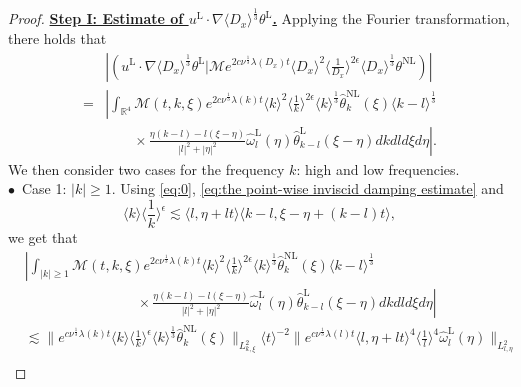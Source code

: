 \documentclass[reqno, 12pt]{amsart} %
\theoremstyle{plain} %
\theoremstyle{definition}
\theoremstyle{remark}
\numberwithin{equation}{section} %
\newcommand{\lt}{\left}
\newcommand{\rt}{\right}
\begin{document}
\begin{proof}
		\underline{\bf Step I: Estimate of  $u^{\mathrm{L}} \cdot  \nabla \langle D_x \rangle^\frac13 \theta^{\mathrm{L}}$.}
		Applying the Fourier transformation, there holds that
		\begin{equation}\begin{aligned} \label{eq:temp8}
				& \left|\left(u^{\mathrm{L}} \cdot \nabla \langle D_x \rangle^\frac13 \theta^{\mathrm{L}} \big| \mathcal{M} e^{2 c \nu^{\frac{1}{3}} \lambda(D_x) t}\langle D_x\rangle^2\langle\frac{1}{D_x}\rangle^{2 \epsilon} \langle D_x \rangle^\frac13 \theta^{\mathrm{NL}}\right)\right| \\
				= & \left|\int_{\mathbb{R}^4} \mathcal{M}(t, k, \xi) e^{2 c \nu^{\frac{1}{3}} \lambda(k) t}\langle k\rangle^2\langle\frac{1}{k}\rangle^{2 \epsilon} \langle k \rangle^\frac13  \hat{\theta }_k^{\mathrm{NL}}(\xi) \langle k-l \rangle^\frac13 \rt. \\
				& \lt.\qquad \times \frac{\eta(k-l)-l(\xi-\eta)}{|l|^2+|\eta|^2} \hat{\omega}_l^{\mathrm{L}}(\eta) \hat{\theta }_{k-l}^{\mathrm{L}}(\xi-\eta) d k d l d \xi d \eta\right|.
		\end{aligned}\end{equation}
		We then consider two cases for the frequency $k$: high and low frequencies.\\
		$\bullet$~Case 1: $|k| \geq 1$.
		Using \eqref{eq:0}, \eqref{eq:the point-wise inviscid damping estimate} and 
		\begin{equation*} 
			\langle k \rangle \langle \frac1k \rangle^\epsilon \lesssim \langle l, \eta+l t\rangle\langle k-l, \xi-\eta+(k-l) t\rangle,
		\end{equation*}
		we get that
		\begin{equation} \label{eq:temp9}
			\begin{aligned}
				&  \left|\int_{|k| \geq  1} \mathcal{M}(t, k, \xi) e^{2 c \nu^{\frac{1}{3}} \lambda(k) t}\langle k\rangle^2\langle\frac{1}{k}\rangle^{2 \epsilon} \langle k \rangle^\frac13  \hat{\theta }_k^{\mathrm{NL}}(\xi) \langle k-l \rangle^\frac13 \rt. \\
				& \lt. \qquad\qquad\qquad\qquad  \times \frac{\eta(k-l)-l(\xi-\eta)}{|l|^2+|\eta|^2} \hat{\omega}_l^{\mathrm{L}}(\eta) \hat{\theta }_{k-l}^{\mathrm{L}}(\xi-\eta) d k d l d \xi d \eta\right| \\
				& \lesssim\|e^{c \nu^{\frac{1}{3}} \lambda(k) t}\langle k\rangle \langle \frac1k \rangle^\epsilon \langle k \rangle^\frac13  \hat{\theta}_k^{\mathrm{NL}}(\xi)\|_{L_{k, \xi}^2}\langle t\rangle^{-2}\|e^{c \nu^{\frac{1}{3}} \lambda(l) t}\langle l, \eta+l t\rangle^4\langle\frac{1}{l}\rangle^4 \hat{\omega}_l^{\mathrm{L}}(\eta)\|_{L_{l, \eta}^2} \\

\end{aligned}
\end{equation}
\end{proof}
\end{document}
